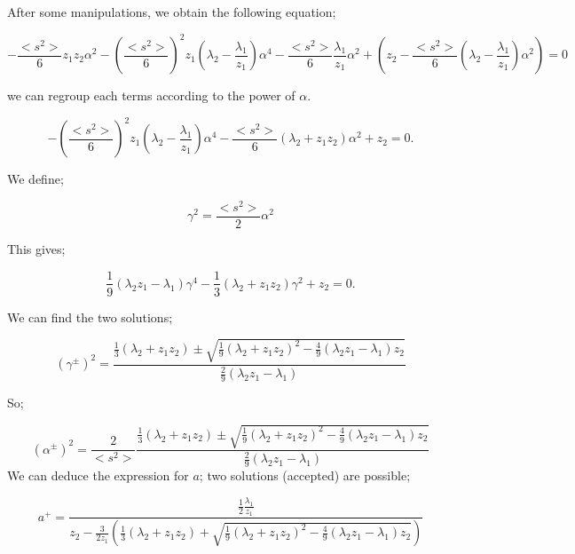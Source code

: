 \documentclass[a4paper, 12pt]{report}
\newcommand{\bl}{\big<}
\newcommand{\bg}{\big>}
\begin{document}
After some manipulations, we obtain the following equation;

\begin{equation}
-\frac{\bl s^2 \bg}{6} z_1z_2 \alpha^2 - \left(\frac{\bl s^2 \bg}{6}\right)^2z_1\left(\lambda_2-\frac{\lambda_1}{z_1}\right)\alpha^4-\frac{\bl s^2 \bg}{6}\frac{\lambda_1}{z_1}\alpha^2+\left(z_2-\frac{\bl s^2 \bg}{6}(\lambda_2-\frac{\lambda_1}{z_1})\alpha^2\right)=0
\end{equation}

we can regroup each terms according to the power of $\alpha$.

\begin{equation}
-\left(\frac{\bl s^2 \bg}{6}\right)^2z_1\left(\lambda_2-\frac{\lambda_1}{z_1}\right)\alpha^4-\frac{\bl s^2 \bg}{6}\left(\lambda_2+z_1z_2\right)\alpha^2+z_2 = 0.
\end{equation}

We define;

\begin{equation}
\gamma^2 = \frac{\bl s^2 \bg}{2}\alpha^2
\end{equation}

This gives;

\begin{equation}
\frac{1}{9}\left(\lambda_2z_1-\lambda_1\right)\gamma^4-\frac{1}{3}\left(\lambda_2+z_1z_2\right)\gamma^2+z_2 = 0.
\end{equation}

We can find the two solutions;

\begin{equation}
\left(\gamma^{\pm}\right)^2= \frac{\frac{1}{3}(\lambda_2+z_1z_2) \pm \sqrt{\frac{1}{9}(\lambda_2+z_1z_2)^2 - \frac{4}{9}(\lambda_2z_1-\lambda_1)z_2}}{ \frac{2}{9}(\lambda_2z_1-\lambda_1)}
\end{equation}

So;

\begin{equation}
\left(\alpha^{\pm}\right)^2= \frac{2}{\bl s^2 \bg} \frac{\frac{1}{3}(\lambda_2+z_1z_2) \pm \sqrt{\frac{1}{9}(\lambda_2+z_1z_2)^2 - \frac{4}{9}(\lambda_2z_1-\lambda_1)z_2}}{ \frac{2}{9}(\lambda_2z_1-\lambda_1)}
\end{equation}
We can deduce the expression for $a$; two solutions (accepted) are possible;

\begin{equation}
a^+ = \frac{\frac{1}{2}\frac{\lambda_1}{z_1}}{z_2-\frac{3}{2z_1}\left(\frac{1}{3}\left(\lambda_2+z_1z_2\right) + \sqrt{\frac{1}{9}(\lambda_2+z_1z_2)^2 - \frac{4}{9}(\lambda_2z_1-\lambda_1)z_2}\right)}
\end{equation}
\end{document}
